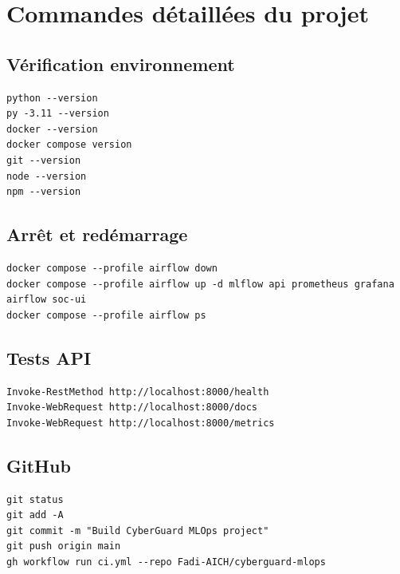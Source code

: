 \chapter{Commandes détaillées du projet}

\section{Vérification environnement}
\begin{lstlisting}
python --version
py -3.11 --version
docker --version
docker compose version
git --version
node --version
npm --version
\end{lstlisting}

\section{Arrêt et redémarrage}
\begin{lstlisting}
docker compose --profile airflow down
docker compose --profile airflow up -d mlflow api prometheus grafana airflow soc-ui
docker compose --profile airflow ps
\end{lstlisting}

\section{Tests API}
\begin{lstlisting}
Invoke-RestMethod http://localhost:8000/health
Invoke-WebRequest http://localhost:8000/docs
Invoke-WebRequest http://localhost:8000/metrics
\end{lstlisting}

\section{GitHub}
\begin{lstlisting}
git status
git add -A
git commit -m "Build CyberGuard MLOps project"
git push origin main
gh workflow run ci.yml --repo Fadi-AICH/cyberguard-mlops
\end{lstlisting}
